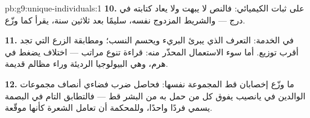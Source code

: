 \begin{solution}{pb:g9:unique-individuals:1}
\textbf{10.} على ثبات  الكيميائي: فالنص لا يبهت ولا
يعاد كتابته في درج --- والشريط المزدوج نفسه، سليمًا بعد
ثلاثين سنة، يقرأ كما وزّع.

\textbf{11.} في الخدمة: التعرف الذي يبرئ البريء ويحسم
النسب؛ ومطابقة الزرع التي تجد أقرب توزيع. أما سوء
الاستعمال المحذّر منه: قراءة تنوع  مراتب ---
اختلاف يضغط في هرم، وهي البيولوجيا الرديئة وراء مظالم
قديمة.

\textbf{12.} ما وزّع إخصابان قط المجموعة نفسها: فحاصل
ضرب فضاءي أنصاف مجموعات الوالدين في يانصيب  يفوق
كل من حمل به من البشر قط --- فالتطابق التام في البصمة
يسمي فردًا واحدًا، وللمحكمة أن تعامل الشعرة كأنها
موقّعة.
\end{solution}
